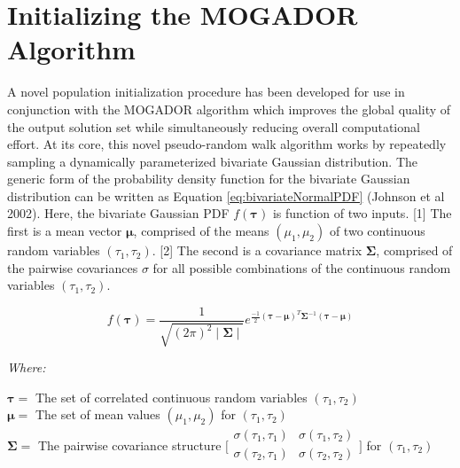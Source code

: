\section{Initializing the MOGADOR Algorithm}
    
A novel population initialization procedure has been developed for use in conjunction with the MOGADOR algorithm which improves the global quality of the output solution set while simultaneously reducing overall computational effort. At its core, this novel pseudo-random walk algorithm works by repeatedly sampling a dynamically parameterized bivariate Gaussian distribution. The generic form of the probability density function for the bivariate Gaussian distribution can be written as Equation \ref{eq:bivariateNormalPDF} (Johnson et al 2002). Here, the bivariate Gaussian PDF $f(\boldsymbol{\tau})$ is function of two inputs. [1] The first is a mean vector $\boldsymbol{\mu}$, comprised of the means $(\mu_1, \mu_2)$ of two continuous random variables $(\tau_1, \tau_2)$. [2] The second is a covariance matrix $\boldsymbol{\Sigma}$, comprised of the pairwise covariances $\sigma$ for all possible combinations of the continuous random variables $(\tau_1, \tau_2)$.
            
            \begin{equation}
            f(\boldsymbol{\tau}) = \frac{1}{ \sqrt{ (2\pi)^2 \mid \boldsymbol{\Sigma} \mid} } e^{ \frac{-1}{2} ( \boldsymbol{\tau} - \boldsymbol{\mu} )^T \boldsymbol{ \Sigma}^{-1} ( \boldsymbol{\tau} - \boldsymbol{\mu} ) }
            \label{eq:bivariateNormalPDF}
            \end{equation}

            \noindent \textit{Where:} \hfill

            \begin{center}
            $\boldsymbol{\tau} =$ The set of correlated continuous random variables $(\tau_1, \tau_2)$
            \\
            $\boldsymbol{\mu} = $ The set of mean values $(\mu_1, \mu_2)$ for $(\tau_1, \tau_2)$
            \\
            $\boldsymbol{\Sigma} =$ The pairwise covariance structure $\bigl[\begin{smallmatrix} \sigma(\tau_{1},\tau_{1}) & \sigma(\tau_{1},\tau_{2}) \\ \sigma(\tau_{2},\tau_{1}) & \sigma(\tau_{2},\tau_{2}) \\ \end{smallmatrix}\bigr]$ for $(\tau_{1}, \tau_{2})$
            \end{center}
            
